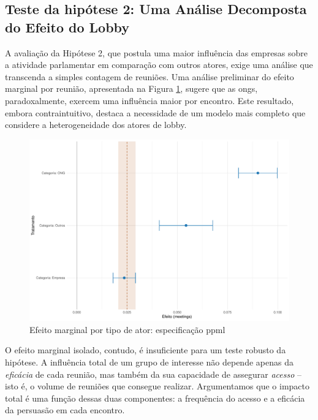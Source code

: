 \subsection{Teste da hipótese 2: Uma Análise Decomposta do Efeito do Lobby}

A avaliação da Hipótese 2, que postula uma maior influência das empresas sobre a atividade parlamentar em comparação com outros atores, exige uma análise que transcenda a simples contagem de reuniões. Uma análise preliminar do efeito marginal por reunião, apresentada na Figura \ref{fig:effect_linear_ppml_treatments}, sugere que as \acrshort{ong}s, paradoxalmente, exercem uma influência maior por encontro. Este resultado, embora contraintuitivo, destaca a necessidade de um modelo mais completo que considere a heterogeneidade dos atores de lobby.

\begin{figure}[htbp]
    \centering
    \includegraphics[width=\textwidth]{figures/h2_test/fig_coeff_treatments_overall.pdf}
    \caption{Efeito marginal por tipo de ator: especificação \acrshort{ppml}}
    \label{fig:effect_linear_ppml_treatments}
\end{figure}

O efeito marginal isolado, contudo, é insuficiente para um teste robusto da hipótese. A influência total de um grupo de interesse não depende apenas da \textit{eficácia} de cada reunião, mas também da sua capacidade de assegurar \textit{acesso} -- isto é, o volume de reuniões que consegue realizar. Argumentamos que o impacto total é uma função dessas duas componentes: a frequência do acesso e a eficácia da persuasão em cada encontro.

